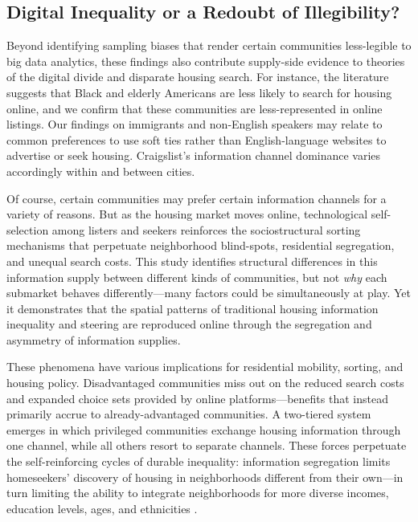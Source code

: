 \documentclass[11pt,letterpaper]{article}
\begin{document}
\subsection{Digital Inequality or a Redoubt of Illegibility?}

Beyond identifying sampling biases that render certain communities less-legible to big data analytics, these findings also contribute supply-side evidence to theories of the digital divide and disparate housing search. For instance, the literature suggests that Black and elderly Americans are less likely to search for housing online, and we confirm that these communities are less-represented in online listings. Our findings on immigrants and non-English speakers may relate to common preferences to use soft ties rather than English-language websites to advertise or seek housing. Craigslist's information channel dominance varies accordingly within and between cities.

Of course, certain communities may prefer certain information channels for a variety of reasons. But as the housing market moves online, technological self-selection among listers and seekers reinforces the sociostructural sorting mechanisms that perpetuate neighborhood blind-spots, residential segregation, and unequal search costs. This study identifies structural differences in this information supply between different kinds of communities, but not \emph{why} each submarket behaves differently---many factors could be simultaneously at play. Yet it demonstrates that the spatial patterns of traditional housing information inequality and steering are reproduced online through the segregation and asymmetry of information supplies.

These phenomena have various implications for residential mobility, sorting, and housing policy. Disadvantaged communities miss out on the reduced search costs and expanded choice sets provided by online platforms---benefits that instead primarily accrue to already-advantaged communities. A two-tiered system emerges in which privileged communities exchange housing information through one channel, while all others resort to separate channels. These forces perpetuate the self-reinforcing cycles of durable inequality: information segregation limits homeseekers' discovery of housing in neighborhoods different from their own---in turn limiting the ability to integrate neighborhoods for more diverse incomes, education levels, ages, and ethnicities \cite[cf.][]{krysan_cycle_2017,ellen_can_2018,pendall_pathways_2018,steil_household_2018}.
\end{document}
